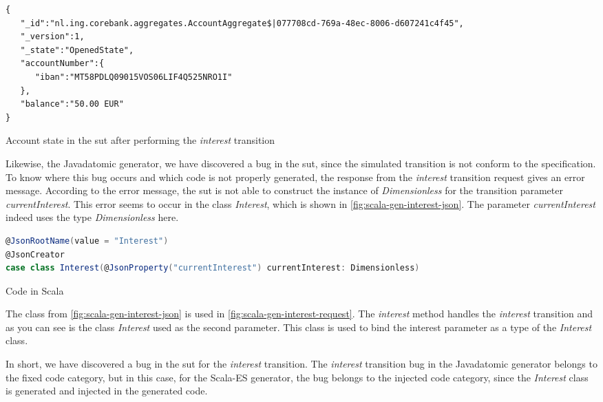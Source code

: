 \begin{sourcecode}[h!]
\begin{lstlisting}[]
{
   "_id":"nl.ing.corebank.aggregates.AccountAggregate$|077708cd-769a-48ec-8006-d607241c4f45",
   "_version":1,
   "_state":"OpenedState",
   "accountNumber":{
      "iban":"MT58PDLQ09015VOS06LIF4Q525NRO1I"
   },
   "balance":"50.00 EUR"
}
\end{lstlisting}
\caption{Account state in the \gls{sut} after performing the \textit{interest} transition}\label{fig:interest-opened-account-scalaes-json}
\end{sourcecode}
\FloatBarrier

Likewise, the Javadatomic generator, we have discovered a bug in the \gls{sut}, since
the simulated transition is not conform to the specification. To know where this
bug occurs and which code is not properly generated, the response from the
\textit{interest} transition request gives an error message. According to the error
message, the \gls{sut} is not able to construct the instance of \textit{Dimensionless}
for the transition parameter \textit{currentInterest}. This error seems to occur
in the class \textit{Interest}, which is shown in
\autoref{fig:scala-gen-interest-json}. The parameter \textit{currentInterest}
indeed uses the type \textit{Dimensionless} here.

\begin{sourcecode}[h!]
\begin{lstlisting}[language=scala]
@JsonRootName(value = "Interest")
@JsonCreator
case class Interest(@JsonProperty("currentInterest") currentInterest: Dimensionless)
\end{lstlisting}
\caption{Code in Scala}\label{fig:scala-gen-interest-json}
\end{sourcecode}
\FloatBarrier

The class from \autoref{fig:scala-gen-interest-json} is used in
\autoref{fig:scala-gen-interest-request}. The \textit{interest} method handles
the \textit{interest} transition and as you can see is the class \textit{Interest} used
as the second parameter. This class is used to bind the interest parameter as a
type of the \textit{Interest} class.

In short, we have discovered a bug in the \gls{sut}
for the \textit{interest} transition. The \textit{interest} transition bug in the Javadatomic
generator belongs to the fixed code category, but in this case, for the Scala-ES
generator, the bug belongs to the injected code category, since the
\textit{Interest} class is generated and injected in the generated code.

